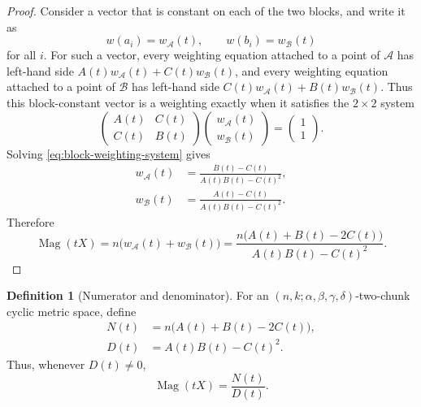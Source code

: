 \documentclass[11pt]{amsart}
\numberwithin{equation}{section}
\theoremstyle{definition}
\newtheorem{definition}[theorem]{Definition}
\theoremstyle{remark}
\DeclareMathOperator{\Mag}{Mag}
\newcommand{\cA}{\mathcal{A}}
\newcommand{\cB}{\mathcal{B}}
\begin{document}
\begin{proof}
Consider a vector that is constant on each of the two blocks, and write it as
\begin{equation}\label{eq:block-weighting}
w(a_i)=w_{\cA}(t),\qquad
w(b_i)=w_{\cB}(t)
\end{equation}
for all \(i\).  For such a vector, every weighting equation attached to a point of \(\cA\) has left-hand side
\(
A(t)w_{\cA}(t)+C(t)w_{\cB}(t)
\),
and every weighting equation attached to a point of \(\cB\) has left-hand side
\(
C(t)w_{\cA}(t)+B(t)w_{\cB}(t)
\).
Thus this block-constant vector is a weighting exactly when it satisfies the \(2\times 2\) system
\begin{equation}\label{eq:block-weighting-system}
\begin{pmatrix}
A(t)&C(t)\\
C(t)&B(t)
\end{pmatrix}
\begin{pmatrix}
w_{\cA}(t)\\
w_{\cB}(t)
\end{pmatrix}
=
\begin{pmatrix}
1\\
1
\end{pmatrix}.
\end{equation}
Solving \eqref{eq:block-weighting-system} gives
\begin{align}
w_{\cA}(t)&=\frac{B(t)-C(t)}{A(t)B(t)-C(t)^2},
\label{eq:w-A}\\
w_{\cB}(t)&=\frac{A(t)-C(t)}{A(t)B(t)-C(t)^2}.
\label{eq:w-B}
\end{align}
Therefore
\begin{equation}\label{eq:mag-sum-weights}
\Mag(tX)=n\bigl(w_{\cA}(t)+w_{\cB}(t)\bigr)
=\frac{n\bigl(A(t)+B(t)-2C(t)\bigr)}{A(t)B(t)-C(t)^2}.
\end{equation}
\end{proof}

\begin{definition}[Numerator and denominator]\label{def:N-D}
For an \((n,k;\alpha,\beta,\gamma,\delta)\)-two-chunk cyclic metric space, define
\begin{align}
N(t)&=n\bigl(A(t)+B(t)-2C(t)\bigr),
\label{eq:N-t-definition}\\
D(t)&=A(t)B(t)-C(t)^2.
\label{eq:D-t-definition}
\end{align}
Thus, whenever \(D(t)\neq 0\),
\begin{equation}\label{eq:mag-N-D}
\Mag(tX)=\frac{N(t)}{D(t)}.
\end{equation}
\end{definition}
\end{document}
